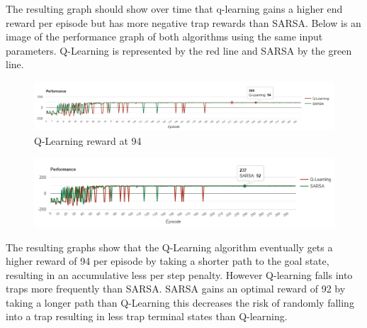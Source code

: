 The resulting graph should show over time that q-learning gains a higher end reward per episode but has more negative trap rewards than SARSA.
Below is an image of the performance graph of both algorithms using the same input parameters.
Q-Learning is represented by the red line and SARSA by the green line.
\begin{figure}[h]
	\centering
	\includegraphics[width=1\linewidth]{"img/Q-learning eval"}
	\caption{Q-Learning reward at 94}
	\label{fig:q-learning-eval}
\end{figure}
\begin{figure}[H]
	\centering
	\includegraphics[width=1\linewidth]{img/SarsaEval}
	\caption{}
	\label{fig:sarsaeval}
\end{figure}

The resulting graphs show that the Q-Learning algorithm eventually gets a higher reward of 94 per episode by taking a shorter path to the goal state, resulting in an accumulative less per step penalty. However Q-learning falls into traps more frequently than SARSA.  SARSA gains an optimal reward of 92  by taking a longer path than Q-Learning this decreases the risk of randomly falling into a trap resulting in less trap terminal states than Q-learning.

